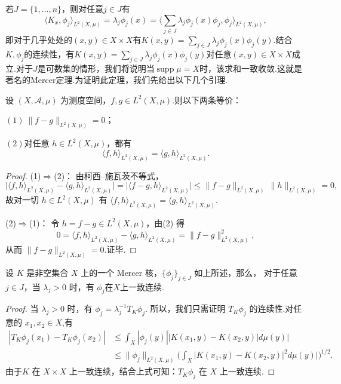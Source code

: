 \documentclass[../master.tex]{subfiles}
\begin{document}
若$J=\{1,\dots,n\}$，则对任意$j\in J$有
\begin{equation*}
    \langle K_x,\phi_j\rangle_{L^2(X,\mu)} = \lambda_j\phi_j(x) = \langle\sum_{j\in J}\lambda_j\phi_j(x)\phi_j,\phi_j\rangle_{L^2(X,\mu)},
\end{equation*}
即对于几乎处处的$(x,y)\in X\times X$有$K(x,y)=\sum_{j\in J}\lambda_j\phi_j(x)\phi_j(y)$.结合$K,\phi_j$的连续性，有$K(x,y)=\sum_{j\in J}\lambda_j\phi_j(x)\phi_j(y)$对任意$(x,y)\in X\times X$成立.对于$J$是可数集的情形，我们将说明当$\operatorname{supp}\mu = X$时，该求和一致收敛.这就是著名的Mercer定理.为证明此定理，我们先给出以下几个引理.
\begin{lemma}[$L^2$意义下相等的等价性]\label{lemma: L2中等价性}
    设 $(X,\mathcal{A},\mu)$ 为测度空间，$f,g\in L^2(X,\mu)$.则以下两条等价：

$(1)~\|f-g\|_{L^2(X,\mu)}=0$；

$(2)$对任意 $h\in L^2(X,\mu)$，都有
    \[
        \langle f,h\rangle_{L^2(X,\mu)}=\langle g,h\rangle_{L^2(X,\mu)}.
    \]


\end{lemma}
\begin{proof}
(1)$\Rightarrow$(2)：
由柯西–施瓦茨不等式，
\[
\big|\langle f,h\rangle_{L^2(X,\mu)}-\langle g,h\rangle_{L^2(X,\mu)}\big|
=\big|\langle f-g,h\rangle_{L^2(X,\mu)}\big|
\le \|f-g\|_{L^2(X,\mu)}\,\|h\|_{L^2(X,\mu)}=0,
\]
故对一切 $h\in L^2(X,\mu)$ 有 $\langle f,h\rangle_{L^2(X,\mu)}=\langle g,h\rangle_{L^2(X,\mu)}$.

(2)$\Rightarrow$(1)：
令 $h=f-g\in L^2(X,\mu)$，由(2) 得
\[
0=\langle f,h\rangle_{L^2(X,\mu)}-\langle g,h\rangle_{L^2(X,\mu)}=\|f-g\|_{L^2(X,\mu)}^2,
\]
从而 $\|f-g\|_{L^2(X,\mu)}=0$.证毕.
\end{proof}


\begin{lemma}\label{lemma: phi_j连续性}
设 $K$ 是非空集合 $X$ 上的一个 Mercer 核，$\{\phi_j\}_{j\in J}$ 如上所述，那么，
对于任意 $j\in J$，当 $\lambda_j>0$ 时，有 $\phi_j$在$X$上一致连续.
\end{lemma}

\begin{proof}
    当  $\lambda _{j}> 0$ 时，有 $\phi_j=\lambda_j^{-1}T_{K}\phi_{j}.$ 所以，我们只需证明 $T_K\phi_{j}$ 的连续性.对任意的 $x_1,x_2\in X$,有
$$\begin{aligned}|T_{K}\phi_{j}(x_{1})-T_{K}\phi_{j}(x_{2})|&\leq\int_{X}|\phi_{j}(y)||K(x_{1},y)-K(x_{2},y)|d\mu(y)|\\&\leq\|\phi_j\|_{L^2(X,\mu)}\Big(\int_X|K(x_1,y)-K(x_2,y)|^2d\mu(y)|\Big)^{1/2}.\end{aligned}$$
由于$K$ 在 $X\times X$ 上一致连续，结合上式可知：$T_K\phi_j$ 在 $X$ 上一致连续.
\end{proof}
\end{document}
